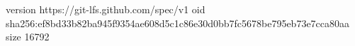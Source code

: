 version https://git-lfs.github.com/spec/v1
oid sha256:ef8bd33b82ba945f9354ae608d5c1c86e30d0bb7fc5678be795eb73e7cca80aa
size 16792
